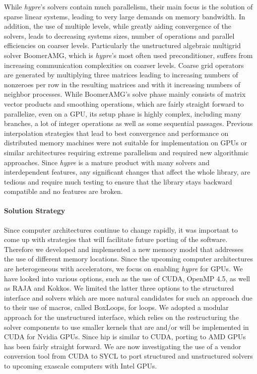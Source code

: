 While {\sl hypre}'s solvers contain much parallelism, their main focus is the solution of sparse linear systems, leading to  very large demands on memory bandwidth. In addition, the use of multiple levels, while greatly aiding convergence of the solvers, leads to decreasing systems sizes, number of operations and parallel efficiencies on coarser levels. Particularly the unstructured algebraic multigrid solver BoomerAMG\cite{HeYa2002}, which is {\sl hypre}'s most often used preconditioner, suffers from increasing communication complexities on coarser levels. Coarse grid operators are generated by multiplying three matrices leading to increasing numbers of nonzeroes per row in the resulting matrices and with it increasing numbers of neighbor processes. While BoomerAMG's solve phase mainly consists of matrix vector products and smoothing operations, which are fairly straight forward to parallelize, even on a GPU, its setup phase is highly complex, including many branches, a lot of integer operations as well as some sequential passages. Previous interpolation strategies that lead to best convergence and performance on distributed memory machines were not suitable for implementation on GPUs or similar architectures requiring extreme parallelism and required new algorithmic approaches. Since {\sl hypre} is a mature product with many solvers and interdependent features, any significant changes that affect the whole library, are tedious and require much testing to ensure that the library stays backward compatible and no features are broken.

\paragraph{Solution Strategy}

Since computer architectures continue to change rapidly, it was important to come up with strategies that will facilitate future porting of the software. Therefore we developed and implemented a new memory model that addresses the use of different memory locations.
Since the upcoming computer architectures are heterogeneous with accelerators, we focus on enabling {\sl hypre} for GPUs. We have looked into various options, such as the use of CUDA, OpenMP 4.5, as well as RAJA and Kokkos. We limited the latter three options to the structured interface and solvers which are more natural candidates for such an approach due to their use of macros, called BoxLoops, for loops. We adopted a modular approach for the unstructured interface, which relies on the restructuring the solver components to use smaller kernels that are and/or will be implemented in CUDA for Nvidia GPUs. Since hip is similar to CUDA, porting to AMD GPUs has been fairly straight forward. We are now investigating the use of a vendor conversion tool from CUDA to SYCL to port structured and unstructured solvers to upcoming exascale computers with Intel GPUs.

